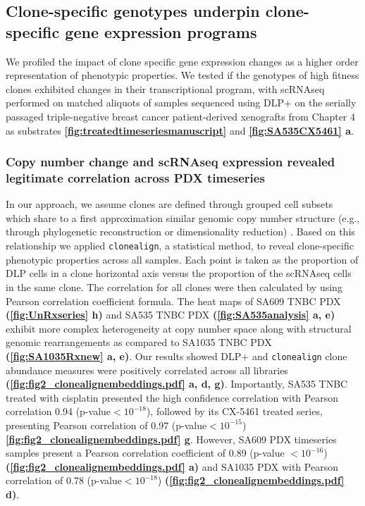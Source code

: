 \subsection{Clone-specific genotypes underpin clone-specific gene expression programs}
We profiled the impact of clone specific gene expression changes as a higher order representation of phenotypic properties. We tested if the genotypes of high fitness clones exhibited changes in their transcriptional program, with scRNAseq performed on matched aliquots of samples sequenced using DLP+ on the serially passaged triple-negative breast cancer patient-derived xenografts from Chapter 4 as substrates \textbf{\autoref{fig:treatedtimeseriesmanuscript}} and \textbf{\autoref{fig:SA535CX5461} a}.

\subsubsection{Copy number change and scRNAseq expression revealed legitimate correlation across PDX timeseries}
  In our approach, we assume clones are defined through grouped cell subsets which share to a first approximation similar genomic copy number structure (e.g., through phylogenetic reconstruction or dimensionality reduction) \cite{laks2019clonal}. Based on this relationship we applied
  \texttt{clonealign}, a statistical method, \cite{campbell2019clonealign} to reveal clone-specific phenotypic properties across all samples.
  Each point is taken as the proportion of DLP cells in a clone horizontal axis versus the proportion of the scRNAseq cells in the same clone. The  correlation for all clones were then calculated by using Pearson correlation coefficient formula. The heat maps of SA609 TNBC PDX \textbf{(\autoref{fig:UnRxseries} h)} and SA535 TNBC PDX \textbf{(\autoref{fig:SA535analysis} a, e)} exhibit more complex heterogeneity at copy number space along with structural genomic rearrangements as compared to SA1035 TNBC PDX \textbf{(\autoref{fig:SA1035Rxnew} a, e)}. Our results showed DLP+ and \texttt{clonealign} clone abundance measures were positively correlated across all libraries \textbf{(\autoref{fig:fig2_clonealignembeddings.pdf} a, d, g)}. Importantly, SA535 TNBC treated with cisplatin presented the high confidence correlation with Pearson correlation 0.94 (p-value$< 10^{-18}$), followed by its CX-5461 treated series, presenting Pearson correlation of 0.97 (p-value$< 10^{-15}$) \textbf{\autoref{fig:fig2_clonealignembeddings.pdf} g}. However, SA609 PDX timeseries samples present a Pearson correlation coefficient of 0.89 (p-value $< 10^{-16}$) \textbf{(\autoref{fig:fig2_clonealignembeddings.pdf} a)} and SA1035 PDX with Pearson correlation of 0.78 (p-value$< 10^{-18}$) \textbf{(\autoref{fig:fig2_clonealignembeddings.pdf} d)}.
  
